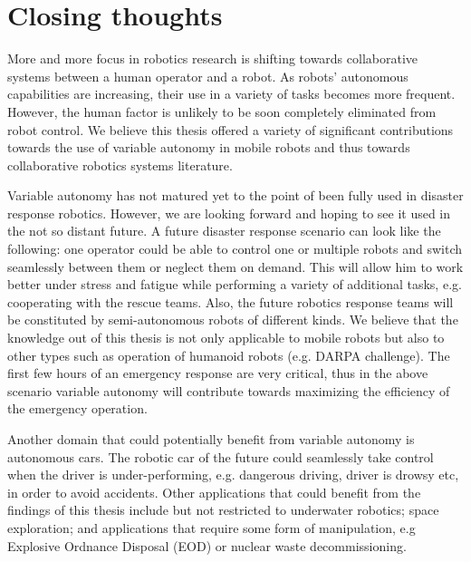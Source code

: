 \documentclass[a4paper,12pt,oneside,openright]{bhamthesis}
\begin{document}
\section{Closing thoughts}
More and more focus in robotics research is shifting towards collaborative systems between a human operator and a robot. As robots' autonomous capabilities are increasing, their use in a variety of tasks becomes more frequent. However, the human factor is unlikely to be soon completely eliminated from robot control. We believe this thesis offered a variety of significant contributions towards the use of variable autonomy in mobile robots and thus towards collaborative robotics systems literature.

Variable autonomy has not matured yet to the point of been fully used in disaster response robotics. However, we are looking forward and hoping to see it used in the not so distant future. A future disaster response scenario can look like the following: one operator could be able to control one or multiple robots and switch seamlessly between them or neglect them on demand. This will allow him to work better under stress and fatigue while performing a variety of additional tasks, e.g. cooperating with the rescue teams. Also, the future robotics response teams will be constituted by semi-autonomous robots of different kinds. We believe that the knowledge out of this thesis is not only applicable to mobile robots but also to other types such as operation of humanoid robots (e.g. DARPA challenge). The first few hours of an emergency response are very critical, thus in the above scenario variable autonomy will contribute towards maximizing the efficiency of the emergency operation.

Another domain that could potentially benefit from variable autonomy is autonomous cars. The robotic car of the future could seamlessly take control when the driver is under-performing, e.g. dangerous driving, driver is drowsy etc, in order to avoid accidents. Other applications that could benefit from the findings of this thesis include but not restricted to underwater robotics; space exploration; and applications that require some form of manipulation, e.g Explosive Ordnance Disposal (EOD) or nuclear waste decommissioning.

\backmatter 




\end{document}

